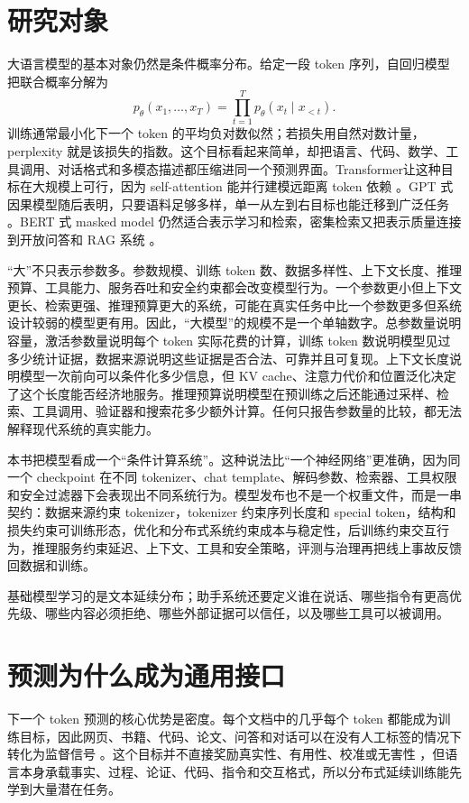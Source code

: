 \documentclass[UTF8,zihao=-4,openany]{ctexbook}
\newcommand{\Transformer}{Transformer}
\begin{document}
\section{研究对象}
大语言模型的基本对象仍然是条件概率分布。给定一段 token 序列，自回归模型把联合概率分解为
\[
p_\theta(x_1,\ldots,x_T)=\prod_{t=1}^{T}p_\theta(x_t\mid x_{<t}).
\]
训练通常最小化下一个 token 的平均负对数似然；若损失用自然对数计量，perplexity 就是该损失的指数。这个目标看起来简单，却把语言、代码、数学、工具调用、对话格式和多模态描述都压缩进同一个预测界面。\Transformer 让这种目标在大规模上可行，因为 self-attention 能并行建模远距离 token 依赖 \cite{vaswani2017attention}。GPT 式因果模型随后表明，只要语料足够多样，单一从左到右目标也能迁移到广泛任务 \cite{radford2019language,brown2020language}。BERT 式 masked model 仍然适合表示学习和检索，密集检索又把表示质量连接到开放问答和 RAG 系统 \cite{devlin2018bert,karpukhin2020dense,lewis2020retrieval}。

“大”不只表示参数多。参数规模、训练 token 数、数据多样性、上下文长度、推理预算、工具能力、服务吞吐和安全约束都会改变模型行为。一个参数更小但上下文更长、检索更强、推理预算更大的系统，可能在真实任务中比一个参数更多但系统设计较弱的模型更有用。因此，“大模型”的规模不是一个单轴数字。总参数量说明容量，激活参数量说明每个 token 实际花费的计算，训练 token 数说明模型见过多少统计证据，数据来源说明这些证据是否合法、可靠并且可复现。上下文长度说明模型一次前向可以条件化多少信息，但 KV cache、注意力代价和位置泛化决定了这个长度能否经济地服务。推理预算说明模型在预训练之后还能通过采样、检索、工具调用、验证器和搜索花多少额外计算。任何只报告参数量的比较，都无法解释现代系统的真实能力。

本书把模型看成一个“条件计算系统”。这种说法比“一个神经网络”更准确，因为同一个 checkpoint 在不同 tokenizer、chat template、解码参数、检索器、工具权限和安全过滤器下会表现出不同系统行为。模型发布也不是一个权重文件，而是一串契约：数据来源约束 tokenizer，tokenizer 约束序列长度和 special token，结构和损失约束可训练形态，优化和分布式系统约束成本与稳定性，后训练约束交互行为，推理服务约束延迟、上下文、工具和安全策略，评测与治理再把线上事故反馈回数据和训练。

基础模型学习的是文本延续分布；助手系统还要定义谁在说话、哪些指令有更高优先级、哪些内容必须拒绝、哪些外部证据可以信任，以及哪些工具可以被调用。

\section{预测为什么成为通用接口}
下一个 token 预测的核心优势是密度。每个文档中的几乎每个 token 都能成为训练目标，因此网页、书籍、代码、论文、问答和对话可以在没有人工标签的情况下转化为监督信号 \cite{brown2020language}。这个目标并不直接奖励真实性、有用性、校准或无害性 \cite{ouyang2022training}，但语言本身承载事实、过程、论证、代码、指令和交互格式，所以分布式延续训练能先学到大量潜在任务。
\end{document}
